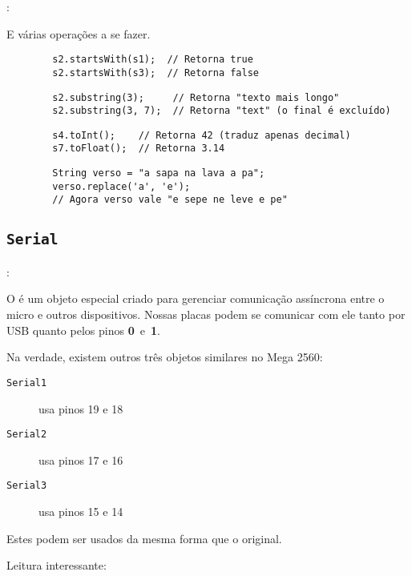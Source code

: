 \begin{frame}[fragile]{\insertsection: \insertsubsection}

	E várias operações a se fazer.

	\begin{verbatim}
		s2.startsWith(s1);  // Retorna true
		s2.startsWith(s3);  // Retorna false
	\end{verbatim}

	\begin{verbatim}
		s2.substring(3);     // Retorna "texto mais longo"
		s2.substring(3, 7);  // Retorna "text" (o final é excluído)
	\end{verbatim}

	\begin{verbatim}
		s4.toInt();    // Retorna 42 (traduz apenas decimal)
		s7.toFloat();  // Retorna 3.14
	\end{verbatim}

	\begin{verbatim}
		String verso = "a sapa na lava a pa";
		verso.replace('a', 'e');
		// Agora verso vale "e sepe ne leve e pe"
	\end{verbatim}

\end{frame}


\subsection{\texttt{Serial}}


\begin{frame}[b]{\insertsection: \insertsubsection}

	O  é um objeto especial criado para gerenciar comunicação assíncrona entre o micro e outros dispositivos. Nossas placas podem se comunicar com ele tanto por USB quanto pelos pinos \textbf{0}~e~\textbf{1}.

	\medskip
	Na verdade, existem outros três objetos similares no Mega 2560:
	\begin{description}
		\item[\texttt{Serial1}] usa pinos 19 e 18
		\item[\texttt{Serial2}] usa pinos 17 e 16
		\item[\texttt{Serial3}] usa pinos 15 e 14
	\end{description}

Estes podem ser usados da mesma forma que o original.

	\vfill
	Leitura interessante: 

\end{frame}


